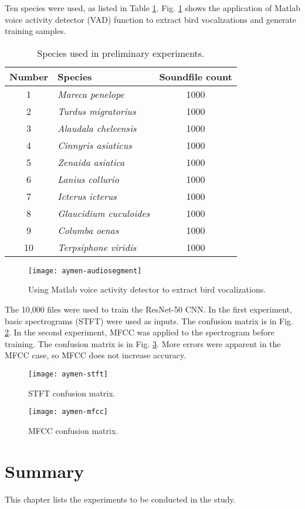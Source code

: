 \noindent
Ten species were used, as listed in Table \ref{species10}.
Fig. \ref{aymen-audiosegment} shows the application of Matlab voice activity detector (VAD) function to extract bird vocalizations and generate training samples. 
\begin{table}[h]
	\caption{Species used in preliminary experiments.}
    \label{species10}
    \centering
	\begin{tabular}{clc}
    \toprule
	\textbf{Number} & 
	\textbf{Species} &
	\textbf{Soundfile count} \\
	\midrule
	1 & \textit{Mareca penelope} & 1000 \\
	2 & \textit{Turdus migratorius} & 1000 \\
	3 & \textit{Alaudala cheleensis} & 1000 \\
	4 & \textit{Cinnyris asiaticus} &  1000 \\
	5 & \textit{Zenaida asiatica} & 1000 \\
	6 & \textit{Lanius collurio} & 1000 \\
	7 & \textit{Icterus icterus} & 1000 \\
	8 & \textit{Glaucidium cuculoides} & 1000 \\
	9 & \textit{Columba oenas} & 1000 \\
	10 & \textit{Terpsiphone viridis} & 1000 \\	
	\bottomrule
	\end{tabular}
\end{table}
\begin{figure}%
    \centering
    \texttt{[image: aymen-audiosegment]}
    \caption{Using Matlab voice activity detector to extract bird vocalizations.}
    \label{aymen-audiosegment}
\end{figure}


The 10,000 files were used to train the ResNet-50 CNN. In the first experiment, basic spectrograms (STFT) were used as inputs. The confusion matrix is in Fig. \ref{aymen-stft}. In the second experiment, MFCC was applied to the spectrogram before training. The confusion matrix is in Fig. \ref{aymen-mfcc}. More errors were apparent in the MFCC case, so MFCC does not increase accuracy. 

\begin{figure}%
    \centering
    \texttt{[image: aymen-stft]}
    \caption{STFT confusion matrix.}
    \label{aymen-stft}
\end{figure}

\begin{figure}%
    \centering
    \texttt{[image: aymen-mfcc]}
    \caption{MFCC confusion matrix.}
    \label{aymen-mfcc}
\end{figure}

\section{Summary}

This chapter lists the experiments to be conducted in the study.